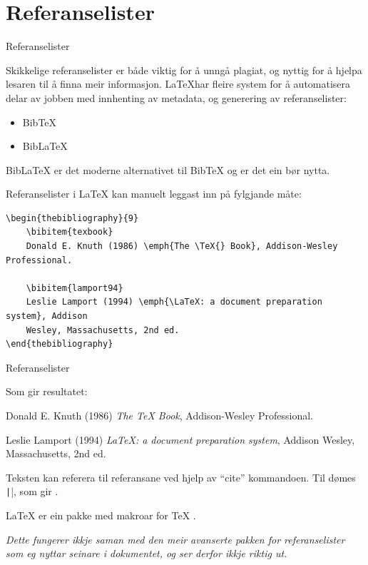 
\section{Referanselister}

	\begin{frame}{Referanselister}
	
	Skikkelige referanselister er både viktig for å unngå plagiat, og nyttig for å hjelpa lesaren til å finna meir informasjon. \LaTeX har fleire system for å automatisera delar av jobben med innhenting av metadata, og generering av referanselister:
	
	\begin{itemize}
		\item BibTeX
		\item BibLaTeX
	\end{itemize}
	
	BibLaTeX er det moderne alternativet til BibTeX og er det ein bør nytta.
	
\end{frame}





\begin{frame}[containsverbatim]
	
	Referanselister i \LaTeX{} kan manuelt leggast inn på fylgjande måte:
	
	\begin{verbatim}
\begin{thebibliography}{9}
	\bibitem{texbook}
	Donald E. Knuth (1986) \emph{The \TeX{} Book}, Addison-Wesley Professional.
	
	\bibitem{lamport94}
	Leslie Lamport (1994) \emph{\LaTeX: a document preparation system}, Addison
	Wesley, Massachusetts, 2nd ed.
\end{thebibliography}
	\end{verbatim}
	
\end{frame}


\begin{frame}[containsverbatim]{Referanselister}
	
	Som gir resultatet:
	
	\begin{thebibliography}{9}
		Donald E. Knuth (1986) \emph{The \TeX{} Book}, Addison-Wesley Professional.
		
		Leslie Lamport (1994) \emph{\LaTeX: a document preparation system}, Addison
		Wesley, Massachusetts, 2nd ed.
	\end{thebibliography}
	
	Teksten kan referera til referansane ved hjelp av ``cite'' kommandoen. Til dømes \texttt|\cite{lamport94}|, som gir \cite{lamport94}.
	
	\LaTeX{} \cite{lamport94} er ein pakke med makroar for \TeX{} \cite{texbook}.
	
	\textit{Dette fungerer ikkje saman med den meir avanserte pakken for referanselister som eg nyttar seinare i dokumentet, og ser derfor ikkje riktig ut.}
	
\end{frame}



